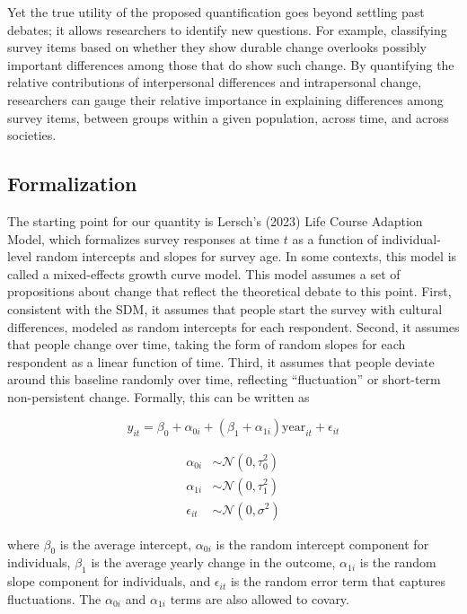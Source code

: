 \documentclass[
  11pt,
]{article}
\begin{document}
Yet the true utility of the proposed quantification goes beyond settling
past debates; it allows researchers to identify new questions. For
example, classifying survey items based on whether they show durable
change overlooks possibly important differences among those that do show
such change. By quantifying the relative contributions of interpersonal
differences and intrapersonal change, researchers can gauge their
relative importance in explaining differences among survey items,
between groups within a given population, across time, and across
societies.

\subsection{Formalization}\label{formalization}

The starting point for our quantity is Lersch's (2023) Life Course
Adaption Model, which formalizes survey responses at time \(t\) as a
function of individual-level random intercepts and slopes for survey
age. In some contexts, this model is called a mixed-effects growth curve
model. This model assumes a set of propositions about change that
reflect the theoretical debate to this point. First, consistent with the
SDM, it assumes that people start the survey with cultural differences,
modeled as random intercepts for each respondent. Second, it assumes
that people change over time, taking the form of random slopes for each
respondent as a linear function of time. Third, it assumes that people
deviate around this baseline randomly over time, reflecting
``fluctuation'' or short-term non-persistent change. Formally, this can
be written as

\[
y_{it} = \beta_0 + \alpha_{0i} + (\beta_1 + \alpha_{1i}) \text{year}_{it} + \epsilon_{it}
\]

\[
\begin{aligned}
\alpha_{0i} &\sim \mathcal{N}(0,\tau^2_{0}) \\
\alpha_{1i} &\sim \mathcal{N}(0,\tau^2_{1}) \\
\epsilon_{it} &\sim \mathcal{N}(0,\sigma^2)
\end{aligned}
\]

where \(\beta_0\) is the average intercept, \(\alpha_{0i}\) is the
random intercept component for individuals, \(\beta_1\) is the average
yearly change in the outcome, \(\alpha_{1i}\) is the random slope
component for individuals, and \(\epsilon_{it}\) is the random error
term that captures fluctuations. The \(\alpha_{0i}\) and \(\alpha_{1i}\)
terms are also allowed to covary.
\end{document}
